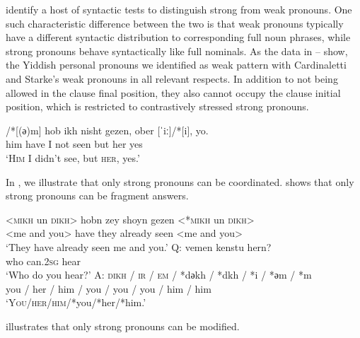 \documentclass[output=paper, hidelinks]{langscibook}
\begin{document}
 \citet{Cardinaletti99} identify a host of syntactic tests to distinguish strong from weak pronouns. One such characteristic difference between the two is that weak pronouns typically have a different syntactic distribution to corresponding full noun phrases, while strong pronouns behave syntactically like full nominals. As the data in -- show, the Yiddish personal pronouns we identified as weak pattern with Cardinaletti and Starke's weak pronouns in all relevant respects. In addition to not being allowed in the clause final position, they also cannot occupy the clause initial position, which is restricted to contrastively stressed strong pronouns.



\ea \gll [ˈɛım]/*[(ә)m] hob ikh nisht gezen, ober [ˈiː]/*[i], yo.\\
him have I not seen but her yes\\
\glt `\textsc{Him} I didn't see, but \textsc{her}, yes.’\label{ex:nishtgezen}
\z

In , we illustrate that only strong pronouns can be coordinated.  shows that only strong pronouns can be fragment answers. 



\ea\label{ex:IPP2} \ea \gll <\textsc{mikh} un \textsc{dikh}> hobn zey shoyn gezen <*\textsc{mikh} un \textsc{dikh}>\\
	     <me and you> have they already seen <me and you>\\
	\glt `They have already seen me and you.’\label{ex:IPP2a}
\ex \gll Q: vemen kenstu hern?\\
     {} who can.2\textsc{sg} hear\\
     \glt `Who do you hear?'\label{ex:IPP2b}
\exi{} \gll A: \textsc{dikh} / \textsc{ir} / \textsc{em} / *dәkh / *dkh / *i / *әm / *m\\
	{} you / her / him / you / you / you / him / him\\
     \glt `\textsc{You/her/him}/*you/*her/*him.'
\z
\z

 illustrates that only strong pronouns can be modified.

\ea\label{ex:norem} 
\z
\z
\end{document}
